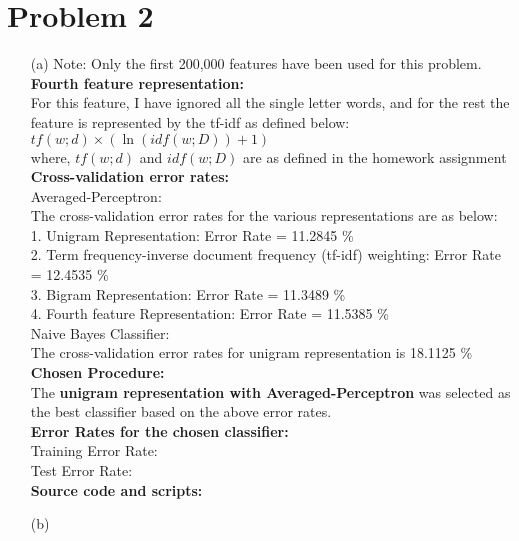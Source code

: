 \documentclass[fleqn]{article}
\begin{document}
\section{Problem 2}{}
\begin{itemize}
	\item[(a)]
		Note: Only the first 200,000 features have been used for this problem.\\
		\textbf{Fourth feature representation:} \\
		For this feature, I have ignored all the single letter words, and for the rest the feature is represented by the tf-idf as defined below: \\
			$tf(w; d) \times (\ln(idf(w;D)) + 1)$ \\
		where, $tf(w;d)$ and $idf(w;D)$ are as defined in the homework assignment \\

		\textbf{Cross-validation error rates:}\\
		Averaged-Perceptron:\\
		The cross-validation error rates for the various representations are as below:\\
		1. Unigram Representation: Error Rate = 11.2845 \% \\
		2. Term frequency-inverse document frequency (tf-idf) weighting: Error Rate = 12.4535 \% \\
		3. Bigram Representation: Error Rate = 11.3489 \% \\
		4. Fourth feature Representation: Error Rate = 11.5385 \% \\
		
		Naive Bayes Classifier:\\
		The cross-validation error rates for unigram representation is 18.1125 \% \\
		
		\textbf{Chosen Procedure:}\\
		The \textbf{unigram representation with Averaged-Perceptron} was selected as the best classifier based on the above error rates.\\

		\textbf{Error Rates for the chosen classifier:}\\
		Training Error Rate:\\
		Test Error Rate:\\

		\textbf{Source code and scripts:}\\
 
        \item[(b)] 
\end{itemize}
\end{document}
